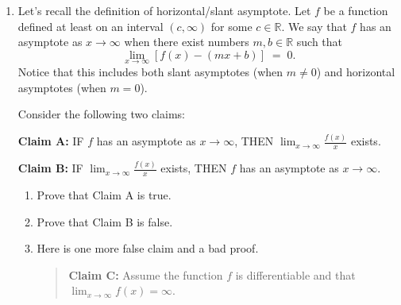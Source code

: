 \documentclass[12pt]{exam}
\newcommand {\DS} [1] {${\displaystyle #1}$}
\newcommand{\vv}{\vspace{.1cm}}
\newcommand{\R}{\mathbb{R}}
\begin{document}
\begin{enumerate}
 Let $f$ be a function defined on an interval $I$.  Given two points $P$ and $Q$ on the graph of $f$, we will call $m_{P,Q}$ the slope of the line going through $P$ and $Q$.  We say that the function $f$ is ``cave up" on $I$ when for every 3 different points $P$, $Q$, and $R$ on the graph of $f$, if $P$ is to the left of $Q$, and $Q$ is to the left of $R$, then $m_{P,Q} < m_{Q,R}$.  Sketch a graph and make sure you understand this definition geometrically  before continuing.
 
 Assume $f$ is differentiable on $I$. 
		Prove that IF $f$ is concave up on $I$, THEN $f$ is cave up on $I$.


\emph{Hint:}  Use MVT.

\emph{Note:}  It is also possible to prove that cave up implies concave up, but we will skip it for now.  In fact, all of the different versions of concavity you have learned are equivalent for differentiable functions.	

\vv

\item  Let's recall the definition of horizontal/slant asymptote.  Let $f$ be a function defined at least on an interval $(c,\infty)$ for some $c \in \R$.
We say that $f$ has an asymptote as $x \to \infty$ when there exist numbers $m, b \in \R$ such that
	$$	
		\lim_{x \to \infty} \left[ f(x) - \left( mx + b \right) \right] \; = \; 0.
	$$
Notice that this includes both slant asymptotes (when $m \neq 0$) and horizontal asymptotes (when $m =0$).
	
Consider the following two claims:	
			\begin{center}
				{\bf Claim A:} \quad \quad
					IF $f$ has an asymptote as $x \to \infty$,  \quad
					THEN \DS{\lim_{x \to \infty} \frac{f(x)}{x}} exists.
				
				{\bf Claim B:} \quad \quad 		
					IF \DS{\lim_{x \to \infty} \frac{f(x)}{x}} exists, \quad
					THEN $f$ has an asymptote as $x \to \infty$.
			\end{center}
	\begin{enumerate}
		\item Prove that Claim A is true.
		\item Prove that Claim B is false.

		\item  Here is one more false claim and a bad proof.
			\begin{quotation}
				\noindent
				{\bf Claim C:} Assume the function $f$ is differentiable and that \DS{\lim_{x \to \infty} f(x) = \infty}.
				

\end{quotation}
\end{enumerate}
\end{enumerate}
\end{document}
